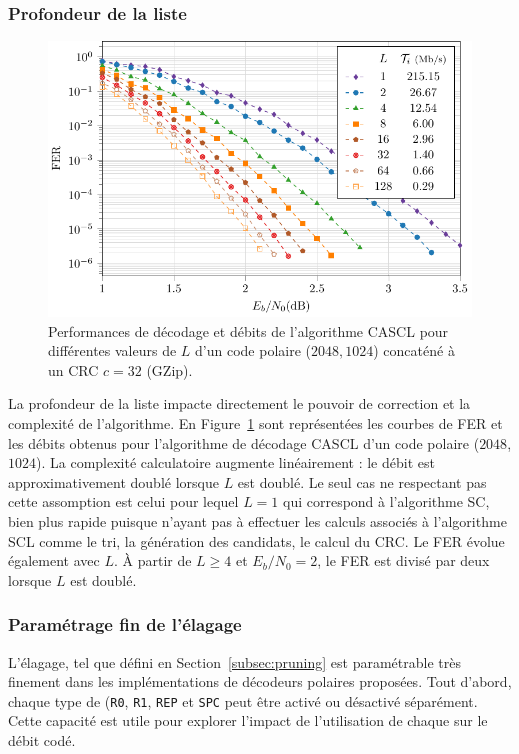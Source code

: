 \subsubsection{Profondeur de la liste}
\begin{figure}[t]
\includegraphics[width=\textwidth]{main/ch2_fig/curves/L/tikz/L}
\caption{Performances de décodage et débits de l'algorithme CASCL pour différentes valeurs de $L$ d'un code polaire ($2048,1024$) concaténé à un CRC $c=32$ (GZip).}
\label{fig:scl_l}
\end{figure}
La profondeur de la liste impacte directement le pouvoir de correction et la complexité de l'algorithme. En Figure~\ref{fig:scl_l} sont représentées les courbes de FER et les débits obtenus pour l'algorithme de décodage CASCL d'un code polaire ($2048$,$1024$). La complexité calculatoire augmente linéairement : le débit est approximativement doublé lorsque $L$ est doublé. Le seul cas ne respectant pas cette assomption est celui pour lequel $L=1$ qui correspond à l'algorithme SC, bien plus rapide puisque n'ayant pas à effectuer les calculs associés à l'algorithme SCL comme le tri, la génération des candidats, le calcul du CRC. Le FER évolue également avec $L$. \`A partir de $L\geq4$ et $E_b/N_0=2$, le FER est divisé par deux lorsque $L$ est doublé.

\subsubsection{Paramétrage fin de l'élagage}
L'élagage, tel que défini en Section~\ref{subsec:pruning} est paramétrable très finement dans les implémentations de décodeurs polaires proposées. Tout d'abord, chaque type de \noeud (\texttt{R0}, \texttt{R1}, \texttt{REP} et \texttt{SPC} peut être activé ou désactivé séparément. Cette capacité est utile pour explorer l'impact de l'utilisation de chaque \noeud sur le débit codé.

